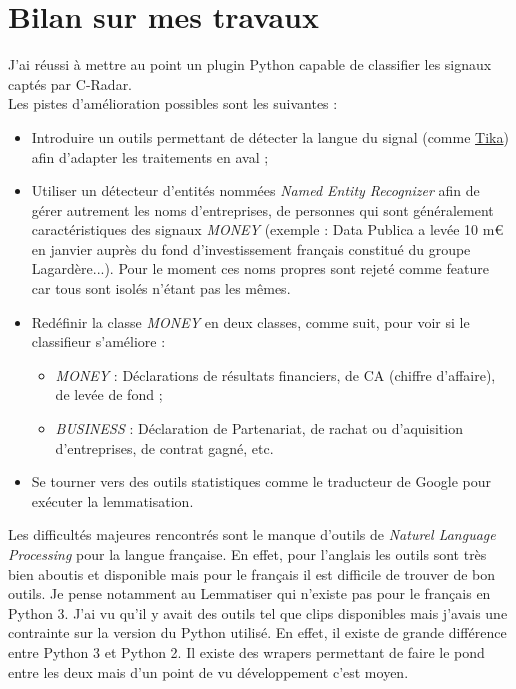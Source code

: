 \section{Bilan sur mes travaux}
    J'ai réussi à mettre au point un plugin Python capable de classifier les signaux captés par C-Radar.\\

    Les pistes d'amélioration possibles sont les suivantes :
    \begin{itemize}
        \item Introduire un outils permettant de détecter la langue du signal (comme \href{https://tika.apache.org/}{Tika}) afin d'adapter les traitements en aval ;
        \item Utiliser un détecteur d'entités nommées \textit{Named Entity Recognizer} afin de gérer autrement les noms d'entreprises, de personnes qui sont généralement caractéristiques des signaux \textit{MONEY} (exemple : \og Data Publica a levée 10 m€ en janvier auprès du fond d'investissement français constitué du groupe Lagardère...\fg). Pour le moment ces noms propres sont rejeté comme feature car tous sont isolés n'étant pas les mêmes.
        \item Redéfinir la classe \textit{MONEY} en deux classes, comme suit, pour voir si le classifieur s'améliore :
        \begin{itemize}
            \item \textit{MONEY} : Déclarations de résultats financiers, de CA (chiffre d'affaire), de levée de fond ;
            \item \textit{BUSINESS} : Déclaration de Partenariat, de rachat ou d'aquisition d'entreprises, de \og contrat gagné\fg, etc.
        \end{itemize}
        \item Se tourner vers des outils statistiques comme le traducteur de Google pour exécuter la lemmatisation.
    \end{itemize}

    Les difficultés majeures rencontrés sont le manque d'outils de \textit{Naturel Language Processing} pour la langue française. En effet, pour l'anglais les outils sont très bien aboutis et disponible mais pour le français il est difficile de trouver de bon outils. Je pense notamment au Lemmatiser qui n'existe pas pour le français en Python 3. J'ai vu qu'il y avait des outils tel que clips disponibles mais j'avais une contrainte sur la version du Python utilisé. En effet, il existe de grande différence entre Python 3 et Python 2. Il existe des wrapers permettant de faire le pond entre les deux mais d'un point de vu développement c'est moyen.